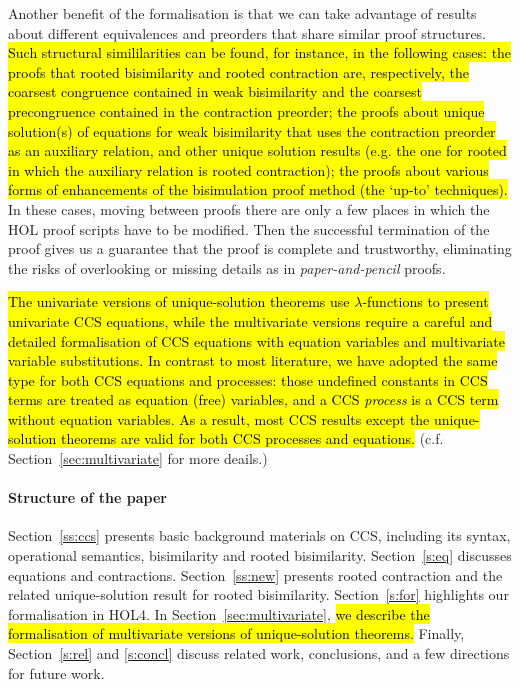 Another benefit of the formalisation is 
that we can take advantage of results about different 
equivalences and preorders that share similar proof structures.
\hl{Such structural simililarities can be found, for instance, in the
following cases: the proofs that rooted bisimilarity and rooted
contraction are, respectively, the coarsest congruence contained in
weak bisimilarity and the coarsest precongruence contained in the
contraction preorder; the proofs about unique solution(s) of equations
for weak bisimilarity that uses the contraction preorder as an
auxiliary relation, and other unique solution results (e.g. the one
for rooted in which the auxiliary relation is rooted contraction); the
proofs about various forms of enhancements of the bisimulation proof
method (the `up-to' techniques).}
%
In these cases, moving between proofs there are only a few places in
which the HOL proof scripts have to be modified.
Then the successful termination of the proof gives us a guarantee that the proof is
complete and trustworthy, eliminating the risks 
of overlooking or missing details as in \emph{paper-and-pencil} proofs.

\hl{The univariate versions of unique-solution theorems use
$\lambda$-functions to present univariate CCS equations,
while the multivariate versions require a
careful and detailed formalisation of CCS equations with equation
variables and multivariate variable substitutions.
In contrast to most literature, we have adopted the same
type for both CCS equations and processes: those undefined constants
in CCS terms are treated as equation (free) variables, and a CCS
\emph{process} is a CCS term without equation variables. As a result,
most CCS results except the unique-solution theorems are valid for
both CCS processes and equations.} (c.f. Section~\ref{sec:multivariate}
for more deails.)

\paragraph{Structure of the paper}

Section~\ref{ss:ccs} presents basic background materials on CCS,
including its syntax, operational semantics, bisimilarity and rooted
bisimilarity.
Section~\ref{s:eq} discusses equations and contractions.
Section~\ref{ss:new} presents rooted contraction and the related
unique-solution result for rooted bisimilarity.
Section~\ref{s:for} highlights our formalisation in HOL4.
In Section~\ref{sec:multivariate}, \hl{we describe the formalisation of
multivariate versions of unique-solution theorems.}
Finally,  Section~\ref{s:rel} and \ref{s:concl} discuss related work,
conclusions, and a few directions for future work.

